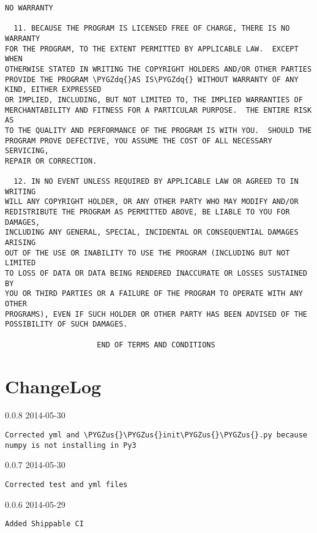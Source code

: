 \documentclass[letterpaper,10pt,english]{sphinxmanual}
\def\PYGZus{\char`\_}
\def\PYGZdq{\char`\"}
\begin{document}
\begin{Verbatim}[commandchars=\\\{\}]
                            NO WARRANTY

  11. BECAUSE THE PROGRAM IS LICENSED FREE OF CHARGE, THERE IS NO WARRANTY
FOR THE PROGRAM, TO THE EXTENT PERMITTED BY APPLICABLE LAW.  EXCEPT WHEN
OTHERWISE STATED IN WRITING THE COPYRIGHT HOLDERS AND/OR OTHER PARTIES
PROVIDE THE PROGRAM \PYGZdq{}AS IS\PYGZdq{} WITHOUT WARRANTY OF ANY KIND, EITHER EXPRESSED
OR IMPLIED, INCLUDING, BUT NOT LIMITED TO, THE IMPLIED WARRANTIES OF
MERCHANTABILITY AND FITNESS FOR A PARTICULAR PURPOSE.  THE ENTIRE RISK AS
TO THE QUALITY AND PERFORMANCE OF THE PROGRAM IS WITH YOU.  SHOULD THE
PROGRAM PROVE DEFECTIVE, YOU ASSUME THE COST OF ALL NECESSARY SERVICING,
REPAIR OR CORRECTION.

  12. IN NO EVENT UNLESS REQUIRED BY APPLICABLE LAW OR AGREED TO IN WRITING
WILL ANY COPYRIGHT HOLDER, OR ANY OTHER PARTY WHO MAY MODIFY AND/OR
REDISTRIBUTE THE PROGRAM AS PERMITTED ABOVE, BE LIABLE TO YOU FOR DAMAGES,
INCLUDING ANY GENERAL, SPECIAL, INCIDENTAL OR CONSEQUENTIAL DAMAGES ARISING
OUT OF THE USE OR INABILITY TO USE THE PROGRAM (INCLUDING BUT NOT LIMITED
TO LOSS OF DATA OR DATA BEING RENDERED INACCURATE OR LOSSES SUSTAINED BY
YOU OR THIRD PARTIES OR A FAILURE OF THE PROGRAM TO OPERATE WITH ANY OTHER
PROGRAMS), EVEN IF SUCH HOLDER OR OTHER PARTY HAS BEEN ADVISED OF THE
POSSIBILITY OF SUCH DAMAGES.

                     END OF TERMS AND CONDITIONS
\end{Verbatim}


\chapter{ChangeLog}
\label{changelog::doc}\label{changelog:changelog}
0.0.8 2014-05-30

\begin{Verbatim}[commandchars=\\\{\}]
Corrected yml and \PYGZus{}\PYGZus{}init\PYGZus{}\PYGZus{}.py because numpy is not installing in Py3
\end{Verbatim}

0.0.7 2014-05-30

\begin{Verbatim}[commandchars=\\\{\}]
Corrected test and yml files
\end{Verbatim}

0.0.6 2014-05-29

\begin{Verbatim}[commandchars=\\\{\}]
Added Shippable CI
\end{Verbatim}
\end{document}
